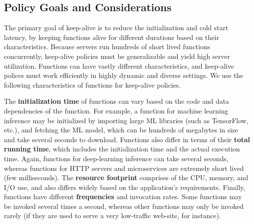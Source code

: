 \subsection{Policy Goals and Considerations}


The primary goal of keep-alive is to reduce the initialization and cold start latency, by keeping functions alive for different durations based on their characteristics. 
Because servers run hundreds of short lived functions concurrently, keep-alive policies must be generalizable and yield high server utilization. 
Functions can have vastly different characteristics, and keep-alive polices must work efficiently in highly dynamic and diverse settings. %
We use the following characteristics of functions for keep-alive policies.


The \textbf{initialization time} of functions can vary based on the code and data dependencies of the function.  
For example, a function for machine learning inference may be initialized by importing large ML libraries (such as TensorFlow, etc.), and fetching the ML model, which can be hundreds of megabytes in size and take several seconds to download. 
Functions also differ in terms of their \textbf{total running time}, which includes the initialization time and the actual execution time. 
Again, functions for deep-learning inference can take several seconds, whereas functions for HTTP servers and microservices are extremely short lived (few milliseconds). 
The \textbf{resource footprint} comprises of the CPU, memory, and I/O use, and also differs widely based on the application's requirements. 
Finally, functions have different \textbf{frequencies} and invocation rates. Some functions may be invoked several times a second, whereas other functions may only be invoked rarely (if they are used to serve a very low-traffic web-site, for instance). 



